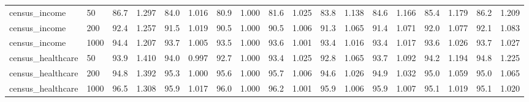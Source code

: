\begin{tabular}{llrrrrrrrrrrrrrrrr}
census\_income & 50 & 86.7 & 1.297 & 84.0 & 1.016 & 80.9 & 1.000 & 81.6 & 1.025 & 83.8 & 1.138 & 84.6 & 1.166 & 85.4 & 1.179 & 86.2 & 1.209\\
census\_income & 200 & 92.4 & 1.257 & 91.5 & 1.019 & 90.5 & 1.000 & 90.5 & 1.006 & 91.3 & 1.065 & 91.4 & 1.071 & 92.0 & 1.077 & 92.1 & 1.083\\
census\_income & 1000 & 94.4 & 1.207 & 93.7 & 1.005 & 93.5 & 1.000 & 93.6 & 1.001 & 93.4 & 1.016 & 93.4 & 1.017 & 93.6 & 1.026 & 93.7 & 1.027\\
census\_healthcare & 50 & 93.9 & 1.410 & 94.0 & 0.997 & 92.7 & 1.000 & 93.4 & 1.025 & 92.8 & 1.065 & 93.7 & 1.092 & 94.2 & 1.194 & 94.8 & 1.225\\
census\_healthcare & 200 & 94.8 & 1.392 & 95.3 & 1.000 & 95.6 & 1.000 & 95.7 & 1.006 & 94.6 & 1.026 & 94.9 & 1.032 & 95.0 & 1.059 & 95.0 & 1.065\\
census\_healthcare & 1000 & 96.5 & 1.308 & 95.9 & 1.017 & 96.0 & 1.000 & 96.2 & 1.001 & 95.9 & 1.006 & 95.9 & 1.007 & 95.1 & 1.019 & 95.1 & 1.020\\
\bottomrule\end{tabular}
